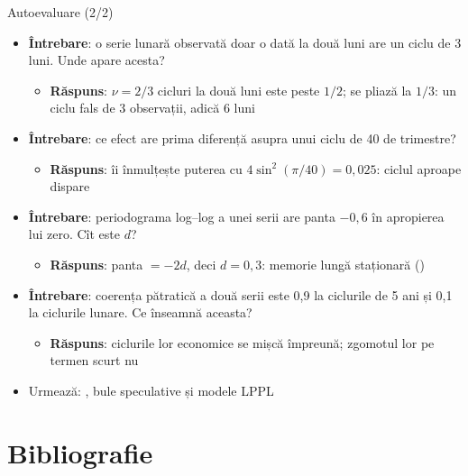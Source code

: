 \begin{frame}{Autoevaluare (2/2)}
\itemsize{\footnotesize}
\begin{itemize}
    \item \textbf{Întrebare}: o serie lunară observată doar o dată la două luni are un ciclu de 3 luni. Unde apare acesta?
    \begin{itemize}
        \item \textbf{Răspuns}: $\nu = 2/3$ cicluri la două luni este peste $1/2$; se pliază la $1/3$: un ciclu fals de 3 observații, adică 6 luni
    \end{itemize}
    \item \textbf{Întrebare}: ce efect are prima diferență asupra unui ciclu de 40 de trimestre?
    \begin{itemize}
        \item \textbf{Răspuns}: îi înmulțește puterea cu $4\sin^2(\pi/40) = 0{,}025$: ciclul aproape dispare
    \end{itemize}
    \item \textbf{Întrebare}: periodograma log--log a unei serii are panta $-0{,}6$ în apropierea lui zero. Cît este $d$?
    \begin{itemize}
        \item \textbf{Răspuns}: panta $= -2d$, deci $d = 0{,}3$: memorie lungă staționară ()
    \end{itemize}
    \item \textbf{Întrebare}: coerența pătratică a două serii este 0,9 la ciclurile de 5 ani și 0,1 la ciclurile lunare. Ce înseamnă aceasta?
    \begin{itemize}
        \item \textbf{Răspuns}: ciclurile lor economice se mișcă împreună; zgomotul lor pe termen scurt nu
    \end{itemize}
    \item Urmează: , bule speculative și modele LPPL
\end{itemize}
\end{frame}


\section{Bibliografie}

